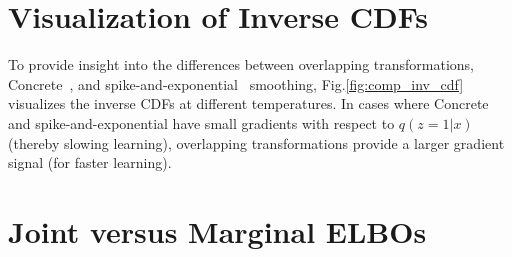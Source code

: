 \documentclass{article}
\begin{document}
\section{Visualization of Inverse CDFs} \label{app:invCDFViz}
\begin{figure*}
  \centering
    \caption{Visualization of inverse CDF as a function of $q(z=1|x)$ at $\rho=0.25$ for different smoothing transformations with
    three different temperatures ($\lambda$) and inverse temperatures ($\beta$). We have selected temperature values that are often 
    used in practice.
    }
     \label{fig:comp_inv_cdf}
\end{figure*}
To provide insight into the differences between overlapping transformations, Concrete~\cite{maddison2016concrete, jang2016categorical}, and 
spike-and-exponential~\cite{rolfe2016discrete} smoothing, Fig.\ref{fig:comp_inv_cdf} visualizes the inverse CDFs at different temperatures. 
In cases where Concrete and spike-and-exponential have small gradients with respect to $q(z=1|x)$ (thereby slowing learning), overlapping transformations 
provide a larger gradient signal (for faster learning).


\section{Joint versus Marginal ELBOs} \label{app:elbos}
\end{document}
